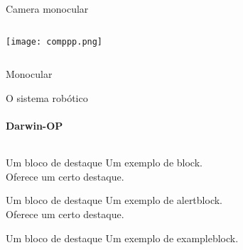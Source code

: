 \begin{frame}[t]{Camera monocular}
    \transboxout[duration=0.5]
    \begin{columns}
            \texttt{[image: comppp.png]}
    \end{columns}
\end{frame}
\begin{frame}[t]{Monocular}
    \transboxout[duration=0.5]
\end{frame}
\begin{frame}[t]{O sistema robótico}
    \transboxout[duration=0.5]
    \framesubtitle{Darwin-OP}
    \begin{columns}
    \end{columns}

    \begin{block}{Um bloco de destaque}
        Um exemplo de block.\\
        Oferece um certo destaque.
    \end{block}

    \begin{alertblock}{Um bloco de destaque}
        Um exemplo de alertblock.\\
        Oferece um certo destaque.
    \end{alertblock}

    \begin{exampleblock}{Um bloco de destaque}
        Um exemplo de exampleblock.
    \end{exampleblock}
\end{frame}
